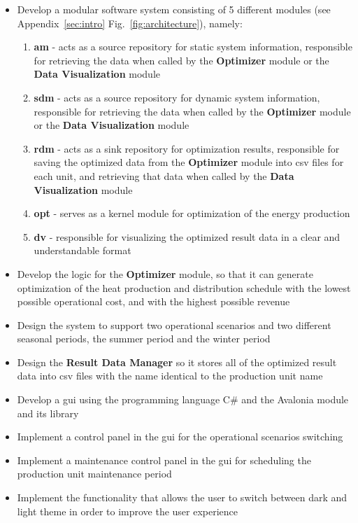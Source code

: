 \begin{itemize}
    \item Develop a modular software system consisting of 5 different modules (see Appendix~\ref{sec:intro}  Fig.~\ref{fig:architecture}), namely:
        \begin{enumerate}
            \item \textbf{\acrfull{am}} - acts as a source repository for static system information,
            responsible for retrieving the data when called by the \textbf{Optimizer} module or the \textbf{Data Visualization} module
            \item \textbf{\acrfull{sdm}} - acts as a source repository for dynamic system information,
            responsible for retrieving the data when called by the \textbf{Optimizer} module or the \textbf{Data Visualization} module
            \item \textbf{\acrfull{rdm}} - acts as a sink repository for optimization results,
            responsible for saving the optimized data from the \textbf{Optimizer} module into \acrshort{csv} files for each unit, and retrieving that data
            when called by the \textbf{Data Visualization} module
            \item \textbf{\acrfull{opt}} - serves as a kernel module for optimization of the energy production
            \item \textbf{\acrfull{dv}} - responsible for visualizing the optimized result data in a clear and
            understandable format
        \end{enumerate}
\end{itemize}

\begin{itemize}
    \item Develop the logic for the \textbf{Optimizer} module, so that it can generate optimization of the heat production
    and distribution schedule with the lowest possible operational cost, and with the highest possible revenue
    \item Design the system to support two operational scenarios and two different seasonal periods, the summer period and the winter period
    \item Design the \textbf{Result Data Manager} so it stores all of the optimized result data into \acrshort{csv} files with the name identical
    to the production unit name
    \item Develop a \acrshort{gui} using the programming language C\# and the Avalonia module and its library
    \item Implement a control panel in the \acrshort{gui} for the operational scenarios switching
    \item Implement a maintenance control panel in the \acrshort{gui} for scheduling the production unit maintenance period
    \item Implement the functionality that allows the user to switch between dark and light theme in order to improve the user experience
\end{itemize}


